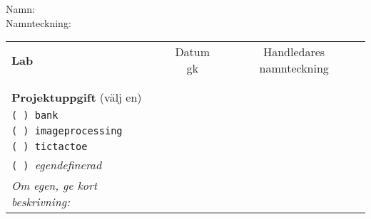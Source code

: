 \vspace{2.5em}\noindent Namn: \dotfill\\

\vspace{1em}\noindent Namnteckning: \dotfill\\

\newcommand{\LabRow}[1]{\\[-1.1em] \texttt{#1} & \dotfill &  \dotfill  \\ \addlinespace }

\begin{table}[h]
\centering
\vspace{1em}
\begin{tabular}{lcc}
\toprule \addlinespace 
{\sffamily\bfseries\small Lab} & {\sffamily\small Datum gk} &	{\sffamily\small Handledares namnteckning}\\ \addlinespace \midrule \\[-0.5em]

\addlinespace \midrule \addlinespace
 \\
{\sffamily\small {\bfseries Projektuppgift} (välj en)	} & \dotfill&\dotfill \\ \addlinespace\addlinespace %
\texttt{( ) bank}  &  &  \\
\texttt{( ) imageprocessing}  \\
\texttt{( ) tictactoe} \\  
\texttt{( ) }\textit{egendefinerad}  \\
\textit{\small Om egen, ge kort beskrivning:}\\
\bottomrule
\end{tabular}
\end{table}